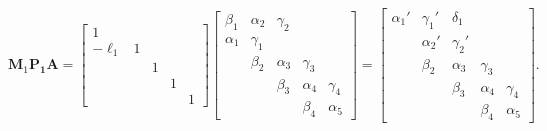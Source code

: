\[
\boldsymbol{M}_1\boldsymbol{P_1}\boldsymbol{A}
=\begin{bmatrix}
      1& & & &\\
-\ell_1&1& & &\\
       & &1& &\\
       & & &1&\\
       & & & &1
\end{bmatrix}
\begin{bmatrix}
 \beta_1&\alpha_2&\gamma_2&        &\\
\alpha_1&\gamma_1&        &        &\\
        & \beta_2&\alpha_3&\gamma_3&\\
        &        & \beta_3&\alpha_4&\gamma_4\\
        &        &        & \beta_4&\alpha_5
\end{bmatrix}
=\begin{bmatrix}
\alpha_1'&\gamma_1'& \delta_1&        &\\
         &\alpha_2'&\gamma_2'&        &\\
         & \beta_2 &\alpha_3 &\gamma_3&\\
         &         & \beta_3 &\alpha_4&\gamma_4\\
         &         &         & \beta_4&\alpha_5
\end{bmatrix}.
\]



